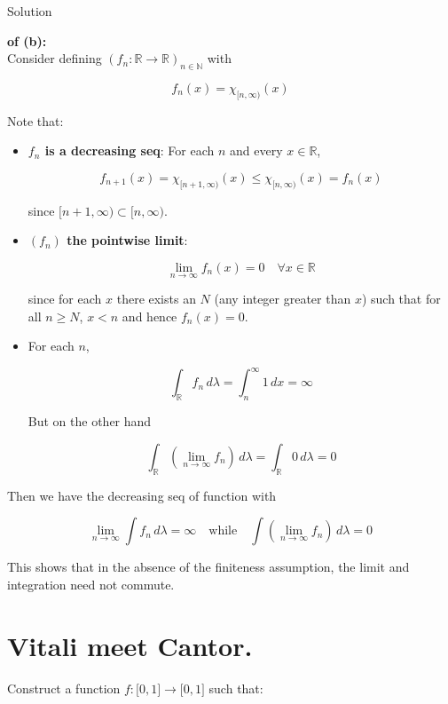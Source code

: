 \begin{qlsolution}{Solution}

\textbf{of (b):}\\
Consider defining \((f_{n}:\mathbb{R}\rightarrow\mathbb{R})_{n \in \mathbb{N}}\) with

\[f_{n}(x) = \chi_{\lbrack n,\infty)}(x)\]

Note that:

\begin{itemize}
\item
  \textbf{\(f_{n}\) is a decreasing seq}: For each \(n\) and every \(x \in \mathbb{R}\),

  \[f_{n + 1}(x) = \chi_{\lbrack n + 1,\infty)}(x) \leq \chi_{\lbrack n,\infty)}(x) = f_{n}(x)\]

  since \(\lbrack n + 1,\infty) \subset \lbrack n,\infty)\).
\item
  \textbf{\((f_{n})\) the pointwise limit}:

  \[\lim\limits_{n\rightarrow\infty}f_{n}(x) = 0\quad\forall x \in \mathbb{R}\]

  since for each \(x\) there exists an \(N\) (any integer greater than \(x\)) such that for all \(n \geq N\), \(x < n\) and hence \(f_{n}(x) = 0\).
\item
  For each \(n\),

  \[\int_{\mathbb{R}}f_{n}\, d\lambda = \int_{n}^{\infty}1\, dx = \infty\]

  But on the other hand

  \[\int_{\mathbb{R}}(\lim\limits_{n\rightarrow\infty}f_{n})\, d\lambda = \int_{\mathbb{R}}0\, d\lambda = 0\]
\end{itemize}

Then we have the decreasing seq of function with

\[\lim\limits_{n\rightarrow\infty}\int f_{n}\, d\lambda = \infty\quad\text{while}\quad\int(\lim\limits_{n\rightarrow\infty}f_{n})\, d\lambda = 0\]

This shows that in the absence of the finiteness assumption, the limit and integration need not commute.

\end{qlsolution}

\section{Vitali meet Cantor.}

Construct a function \(f:\lbrack 0,1\rbrack\rightarrow\lbrack 0,1\rbrack\) such that:

